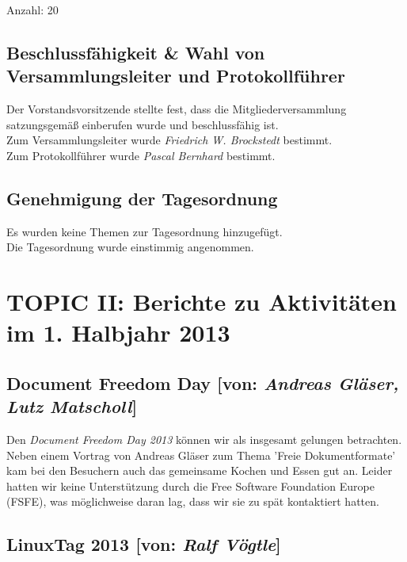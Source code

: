 \documentclass[11pt,a4paper,ngerman]{article}
\begin{document}
    Anzahl: 20

  \subsection{Beschlussfähigkeit \& Wahl von Versammlungsleiter und 
	      Protokollführer}

	      Der Vorstandsvorsitzende stellte fest, dass die 
	      Mitgliederversammlung satzungsgemäß einberufen wurde und 
	      beschlussfähig ist. \\
	      Zum Versammlungsleiter wurde \emph{Friedrich W. Brockstedt} 
	      bestimmt. \\
	      Zum Protokollführer wurde \emph{Pascal Bernhard} bestimmt.



  \subsection{Genehmigung der Tagesordnung}

	      Es wurden keine Themen zur Tagesordnung hinzugefügt. \\
	      Die Tagesordnung wurde einstimmig angenommen.

\newpage{}	  
	
	
\section{TOPIC II: Berichte zu Aktivitäten im 1. Halbjahr 2013}

  
  \subsection{Document Freedom Day [von: 
              \textcolor{hellgrau.60}{\textsl{Andreas Gläser, Lutz Matscholl}}]}

              
Den \textsl{Document Freedom Day 2013} können wir als insgesamt 
gelungen betrachten. Neben einem Vortrag von Andreas Gläser zum Thema 'Freie 
Dokumentformate' kam bei den Besuchern auch das gemeinsame Kochen und Essen gut 
an. Leider hatten wir keine Unterstützung durch die Free Software Foundation 
Europe (FSFE), was möglichweise daran lag, dass wir sie zu spät kontaktiert 
hatten.



  \subsection{LinuxTag 2013 [von: \textcolor{hellgrau.60}{\textsl{Ralf 
              Vögtle}}]}
	    
\end{document}
